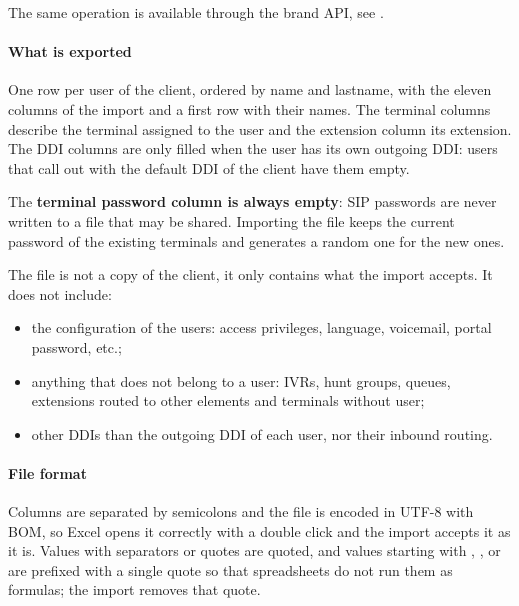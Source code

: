 \documentclass[letterpaper,10pt,english]{sphinxmanual}
\begin{document}
The same operation is available through the brand API, see {\hyperref[administration_portal/brand/clients/virtual_pbx:users\string-mass\string-export\string-api]{}}.


\paragraph{What is exported}
\label{administration_portal/brand/clients/virtual_pbx:what-is-exported}
One row per user of the client, ordered by name and lastname, with the eleven
columns of the import and a first row with their names. The terminal columns
describe the terminal assigned to the user and the extension column its
extension. The DDI columns are only filled when the user has its own outgoing
DDI: users that call out with the default DDI of the client have them empty.

The \textbf{terminal password column is always empty}: SIP passwords are never written
to a file that may be shared. Importing the file keeps the current password of
the existing terminals and generates a random one for the new ones.

The file is not a copy of the client, it only contains what the import accepts.
It does not include:
\begin{itemize}
\item {} 
the configuration of the users: access privileges, language, voicemail,
portal password, etc.;

\item {} 
anything that does not belong to a user: IVRs, hunt groups, queues, extensions
routed to other elements and terminals without user;

\item {} 
other DDIs than the outgoing DDI of each user, nor their inbound routing.

\end{itemize}


\paragraph{File format}
\label{administration_portal/brand/clients/virtual_pbx:file-format}
Columns are separated by semicolons and the file is encoded in UTF-8 with BOM, so
Excel opens it correctly with a double click and the import accepts it as it is.
Values with separators or quotes are quoted, and values starting with \sphinxcode{=}, \sphinxcode{+},
\sphinxcode{-} or  are prefixed with a single quote so that spreadsheets do not run
them as formulas; the import removes that quote.
\end{document}
